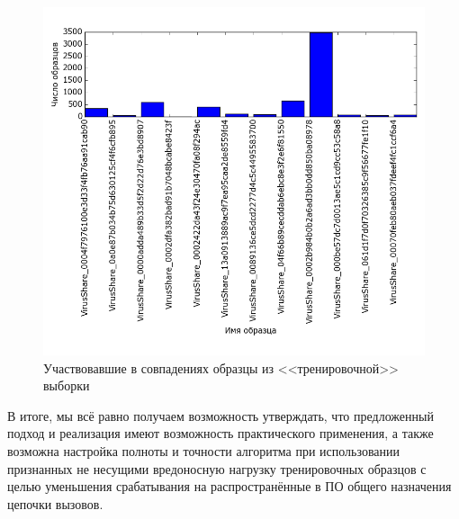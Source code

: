 \begin {figure}[ht]
	\centering
	\includegraphics[width=\linewidth] {img/most_used_kbase_samples.png}
	\caption {Участвовавшие в совпадениях образцы из <<тренировочной>> выборки}
	\label {fig:efficiency}
\end {figure}

В итоге, мы всё равно получаем возможность утверждать, что предложенный подход и реализация имеют возможность практического применения, а также возможна настройка полноты и точности алгоритма при использовании признанных не несущими вредоносную нагрузку тренировочных образцов с целью уменьшения срабатывания на распространённые в ПО общего назначения цепочки вызовов.